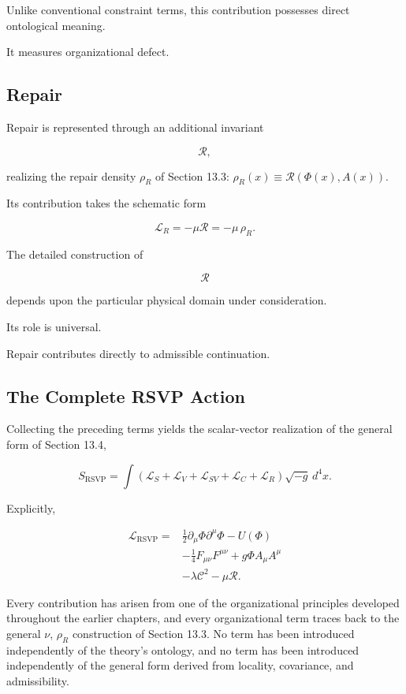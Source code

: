 \documentclass[11pt,oneside]{book}
\numberwithin{equation}{chapter}
\theoremstyle{definition}
\theoremstyle{plain}
\begin{document}
Unlike conventional constraint terms, this contribution possesses direct
ontological meaning.

It measures organizational defect.

\subsection*{Repair}

Repair is represented through an additional invariant

\[
\mathcal R,
\]

realizing the repair density \(\rho_R\) of Section 13.3: \(\rho_R(x)
\equiv\mathcal R(\Phi(x),A(x))\).

Its contribution takes the schematic form

\[
\mathcal L_R
=
-
\mu
\mathcal R
=
-\mu\,\rho_R.
\]

The detailed construction of

\[
\mathcal R
\]

depends upon the particular physical domain under consideration.

Its role is universal.

Repair contributes directly to admissible continuation.

\subsection*{The Complete RSVP Action}

Collecting the preceding terms yields the scalar-vector realization of the
general form of Section 13.4,

\[
S_{\mathrm{RSVP}}
=
\int
\left(
\mathcal L_S
+
\mathcal L_V
+
\mathcal L_{SV}
+
\mathcal L_C
+
\mathcal L_R
\right)
\sqrt{-g}\,
d^4x.
\]

Explicitly,

\[
\boxed{
\begin{aligned}
\mathcal L_{\mathrm{RSVP}}
=
&
\frac12
\partial_\mu\Phi
\partial^\mu\Phi
-
U(\Phi)
\\
&
-
\frac14
F_{\mu\nu}F^{\mu\nu}
+
g\Phi A_\mu A^\mu
\\
&
-
\lambda
\mathcal C^2
-
\mu
\mathcal R.
\end{aligned}
}
\]

Every contribution has arisen from one of the organizational principles
developed throughout the earlier chapters, and every organizational term
traces back to the general \(\nu\), \(\rho_R\) construction of Section 13.3.
No term has been introduced independently of the theory's ontology, and no
term has been introduced independently of the general form derived from
locality, covariance, and admissibility.
\end{document}
